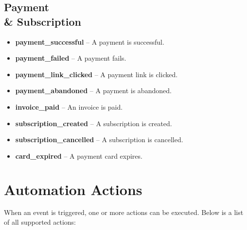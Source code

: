 \documentclass[12pt,a4paper]{article}
\begin{document}
\subsection*{Payment \\& Subscription}
\begin{itemize}[leftmargin=2em]
    \item \textbf{payment\_successful} -- A payment is successful.
    \item \textbf{payment\_failed} -- A payment fails.
    \item \textbf{payment\_link\_clicked} -- A payment link is clicked.
    \item \textbf{payment\_abandoned} -- A payment is abandoned.
    \item \textbf{invoice\_paid} -- An invoice is paid.
    \item \textbf{subscription\_created} -- A subscription is created.
    \item \textbf{subscription\_cancelled} -- A subscription is cancelled.
    \item \textbf{card\_expired} -- A payment card expires.
\end{itemize}

\section{Automation Actions}
When an event is triggered, one or more actions can be executed. Below is a list of all supported actions:
\end{document}
